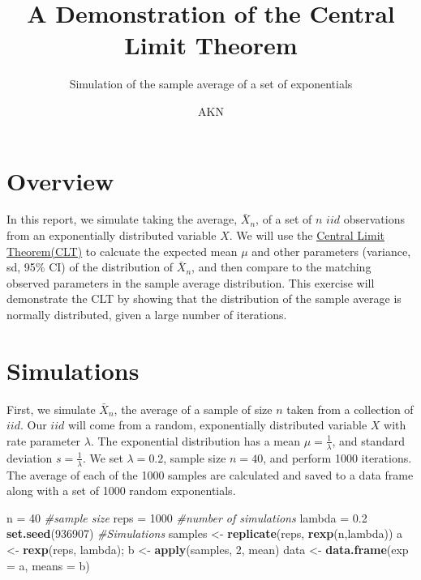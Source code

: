 \documentclass[]{article}
\title{A Demonstration of the Central Limit Theorem}
\subtitle{Simulation of the sample average of a set of exponentials}
\author{AKN}
\date{}
\newenvironment{Shaded}{\begin{snugshade}}{\end{snugshade}}
\newcommand{\KeywordTok}[1]{\textcolor[rgb]{0.13,0.29,0.53}{\textbf{{#1}}}}
\newcommand{\DataTypeTok}[1]{\textcolor[rgb]{0.13,0.29,0.53}{{#1}}}
\newcommand{\DecValTok}[1]{\textcolor[rgb]{0.00,0.00,0.81}{{#1}}}
\newcommand{\FloatTok}[1]{\textcolor[rgb]{0.00,0.00,0.81}{{#1}}}
\newcommand{\StringTok}[1]{\textcolor[rgb]{0.31,0.60,0.02}{{#1}}}
\newcommand{\CommentTok}[1]{\textcolor[rgb]{0.56,0.35,0.01}{\textit{{#1}}}}
\newcommand{\NormalTok}[1]{{#1}}
\begin{document}
\maketitle


\section{Overview}\label{overview}

In this report, we simulate taking the average, \(\bar X_n\), of a set
of \(n\) \(iid\) observations from an exponentially distributed variable
\(X\). We will use the
\href{https://en.wikipedia.org/wiki/Central_limit_theorem}{Central Limit
Theorem(CLT)} to calcuate the expected mean \(\mu\) and other parameters
(variance, sd, 95\% CI) of the distribution of \(\bar X_n\), and then
compare to the matching observed parameters in the sample average
distribution. This exercise will demonstrate the CLT by showing that the
distribution of the sample average is normally distributed, given a
large number of iterations.

\section{Simulations}\label{simulations}

First, we simulate \(\bar X_n\), the average of a sample of size \(n\)
taken from a collection of \(iid\). Our \(iid\) will come from a random,
exponentially distributed variable \(X\) with rate parameter
\(\lambda\). The exponential distribution has a mean
\(\mu = \frac{1}{\lambda}\), and standard deviation
\(s = \frac{1}{\lambda}\). We set \(\lambda = 0.2\), sample size
\(n = 40\), and perform 1000 iterations. The average of each of the 1000
samples are calculated and saved to a data frame along with a set of
1000 random exponentials.

\begin{Shaded}
\begin{Highlighting}[]
\NormalTok{n =}\StringTok{ }\DecValTok{40}  \CommentTok{#sample size}
\NormalTok{reps =}\StringTok{ }\DecValTok{1000} \CommentTok{#number of simulations}
\NormalTok{lambda =}\StringTok{ }\FloatTok{0.2}
\KeywordTok{set.seed}\NormalTok{(}\DecValTok{936907}\NormalTok{)}
\CommentTok{#Simulations}
\NormalTok{samples <-}\StringTok{ }\KeywordTok{replicate}\NormalTok{(reps, }\KeywordTok{rexp}\NormalTok{(n,lambda))}
\NormalTok{a <-}\StringTok{ }\KeywordTok{rexp}\NormalTok{(reps, lambda); b <-}\StringTok{ }\KeywordTok{apply}\NormalTok{(samples, }\DecValTok{2}\NormalTok{, mean)}
\NormalTok{data <-}\StringTok{ }\KeywordTok{data.frame}\NormalTok{(}\DataTypeTok{exp =} \NormalTok{a, }\DataTypeTok{means =} \NormalTok{b)}
\end{Highlighting}
\end{Shaded}
\end{document}

